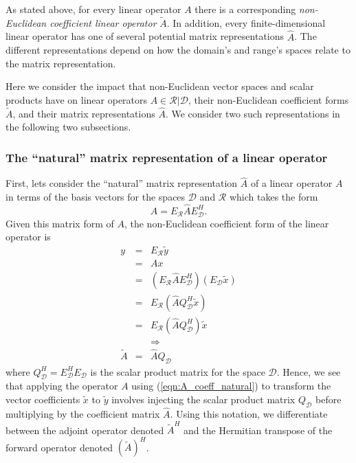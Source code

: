 As stated above, for every linear operator $A$ there is a corresponding
{}\textit{non-Euclidean coefficient linear operator} $\tilde{A}$.  In
addition, every finite-dimensional linear operator has one of several
potential matrix representations $\hat{A}$.  The different representations
depend on how the domain's and range's spaces relate to the matrix
representation.

Here we consider the impact that non-Euclidean vector spaces and scalar
products have on linear operators $A\in\mathcal{R}|\mathcal{D}$, their
non-Euclidean coefficient forms $\tilde{A}$, and their matrix
representations $\hat{A}$.  We consider two such representations in the
following two subsections.

\subsubsection{The ``natural'' matrix representation of a linear operator}

First, lets consider the ``natural'' matrix representation $\hat{A}$ of a
linear operator $A$ in terms of the basis vectors for the spaces $\mathcal{D}$
and $\mathcal{R}$ which takes the form
%
\begin{equation}
A = E_{\mathcal{R}} \hat{A} E_{\mathcal{D}}^H.
\label{eqn:A_coeff_natural}
\end{equation}
%
Given this matrix form of $A$, the non-Euclidean coefficient form of the
linear operator is
%
\begin{eqnarray}
y
& = & E_{\mathcal{R}} \tilde{y} \nonumber \\
& = & A x \nonumber \\
& = & ( E_{\mathcal{R}} \hat{A} E_{\mathcal{D}}^H ) ( E_{\mathcal{D}} \tilde{x} ) \nonumber \\
& = & E_{\mathcal{R}} ( \hat{A} Q_{\mathcal{D}}^H \tilde{x} ) \nonumber \\
& = & E_{\mathcal{R}} ( \hat{A} Q_{\mathcal{D}}^H ) \tilde{x} \nonumber \\
&  & \Rightarrow \nonumber \\
\tilde{A} & = & \hat{A} Q_{\mathcal{D}}
\label{eqn:A_natural_apply}
\end{eqnarray}
%
where $Q_{\mathcal{D}}^H = E_{\mathcal{D}}^H E_{\mathcal{D}}$ is the scalar
product matrix for the space $\mathcal{D}$.  Hence, we see that applying the
operator $A$ using (\ref{eqn:A_coeff_natural}) to transform the vector
coefficients $\tilde{x}$ to $\tilde{y}$ involves injecting the scalar product
matrix $Q_{\mathcal{D}}$ before multiplying by the coefficient matrix
$\hat{A}$.  Using this notation, we differentiate between the adjoint operator
denoted $\tilde{A}^H$ and the Hermitian transpose of the forward operator
denoted $(\tilde{A})^H$.

